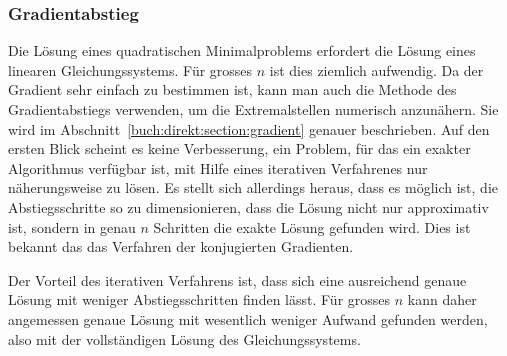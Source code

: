 %
%
\subsubsection{Gradientabstieg}
Die Lösung eines quadratischen Minimalproblems erfordert die Lösung eines
linearen Gleichungssystems.
Für grosses $n$ ist dies ziemlich aufwendig.
Da der Gradient sehr einfach zu bestimmen ist, kann man auch die Methode
des Gradientabstiegs verwenden, um die Extremalstellen numerisch
anzunähern.
Sie wird im Abschnitt~\ref{buch:direkt:section:gradient} genauer
beschrieben.
Auf den ersten Blick scheint es keine Verbesserung, ein Problem, für
das ein exakter Algorithmus verfügbar ist, mit Hilfe eines iterativen
Verfahrenes nur näherungsweise zu lösen.
Es stellt sich allerdings heraus, dass es möglich ist, die Abstiegsschritte
so zu dimensionieren, dass die Lösung nicht nur approximativ ist, sondern
in genau $n$ Schritten die exakte Lösung gefunden wird.
Dies ist bekannt das das Verfahren der konjugierten Gradienten.

Der Vorteil des iterativen Verfahrens ist, dass sich eine ausreichend
genaue Lösung mit weniger Abstiegsschritten finden lässt.
Für grosses $n$ kann daher angemessen genaue Lösung mit wesentlich
weniger Aufwand gefunden werden, also mit der vollständigen Lösung des
Gleichungssystems.


